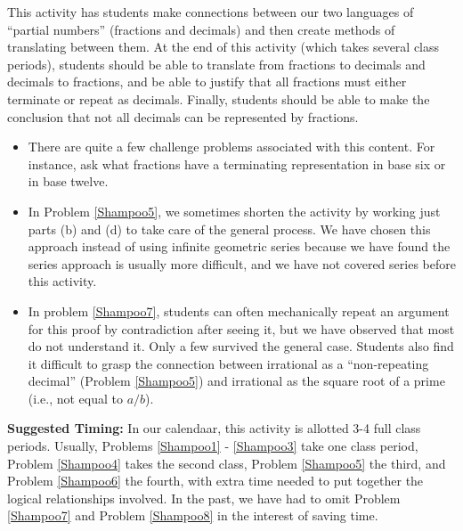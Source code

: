 \documentclass{ximera}
\begin{document}
\newpage
\begin{instructorNotes}
This activity has students make connections between our two languages of ``partial numbers'' (fractions and decimals) and then create methods of translating between them.  At the end of this activity (which takes several class periods), students should be able to translate from fractions to decimals and 
decimals to fractions, and be able to justify that all fractions must either terminate or repeat as decimals.  Finally, students should be able to make the conclusion that not all decimals can be represented by fractions.

\begin{itemize}
\item There are quite a few challenge problems associated with this content.  For instance, ask what fractions have a terminating representation in base six or in base twelve.
\item In Problem \ref{Shampoo5}, we sometimes shorten the activity by working just parts (b) and (d) to take care of the general process.   We have chosen this approach instead of using infinite geometric series because we have found the series approach is usually more difficult, and we have not covered series before this activity. %
\item In problem \ref{Shampoo7}, students can often mechanically repeat an argument for this proof by contradiction after seeing it, but we have observed that most do not understand it.  Only a few survived the general case.  Students also find it difficult to grasp the connection between irrational as a ``non-repeating decimal'' (Problem \ref{Shampoo5}) and irrational as the square root of a prime (i.e., not equal to $a/b$).

\end{itemize}


{\bf Suggested Timing:} In our calendaar, this activity is allotted 3-4 full class periods.  Usually, Problems \ref{Shampoo1} - \ref{Shampoo3} take one class period, Problem \ref{Shampoo4} takes the second class, Problem \ref{Shampoo5} the third, and Problem \ref{Shampoo6} the fourth, with extra time needed to put together the logical relationships involved.  In the past, we have had to omit Problem \ref{Shampoo7} and Problem \ref{Shampoo8} in the interest of saving time.  
\end{instructorNotes}
\end{document}
